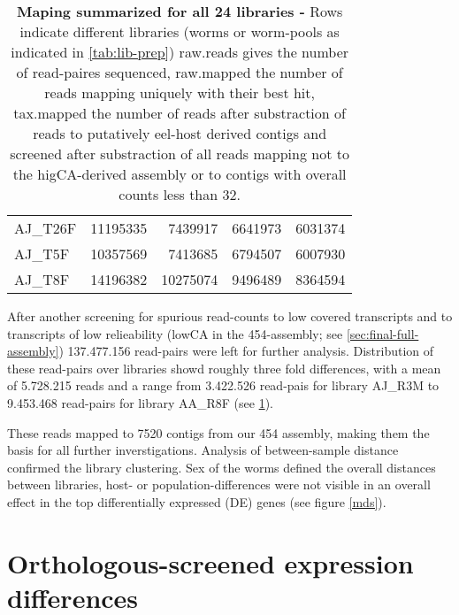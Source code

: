 \begin{table}[h]
\begin{center}
\begin{tabular}{llrrr}
  AJ\_T26F & 11195335 & 7439917 & 6641973 & 6031374 \\ 
  AJ\_T5F & 10357569 & 7413685 & 6794507 & 6007930 \\ 
  AJ\_T8F & 14196382 & 10275074 & 9496489 & 8364594 \\ 
   \hline
\end{tabular}
\caption[Mapping Summary]{\textbf{Maping summarized for all 24
    libraries -} Rows indicate different libraries (worms or
  worm-pools as indicated in \ref{tab:lib-prep}) raw.reads gives the
  number of read-paires sequenced, raw.mapped the number of reads
  mapping uniquely with their best hit, tax.mapped the number of reads
  after substraction of reads to putatively eel-host derived contigs
  and screened after substraction of all reads mapping not to the
  higCA-derived assembly or to contigs with overall counts less than
  32.}
\label{tab:read-clean}
\end{center}
\end{table}

\afterpage{\clearpage}

After another screening for spurious read-counts to low covered
transcripts and to transcripts of low relieability (lowCA in the
454-assembly; see \ref{sec:final-full-assembly}) 137.477.156
read-pairs were left for further analysis. Distribution of these
read-pairs over libraries showd roughly three fold differences, with a
mean of 5.728.215 reads and a range from 3.422.526 read-pais for
library AJ\_R3M to 9.453.468 read-pairs for library AA\_R8F (see
\ref{tab:read-clean}).


These reads mapped to 7520 contigs from our 454 assembly, making them
the basis for all further inverstigations. Analysis of between-sample
distance confirmed the library clustering. Sex of the worms defined
the overall distances between libraries, host- or
population-differences were not visible in an overall effect in the
top differentially expressed (DE) genes (see figure \ref{mds}).

\section{Orthologous-screened expression differences}

